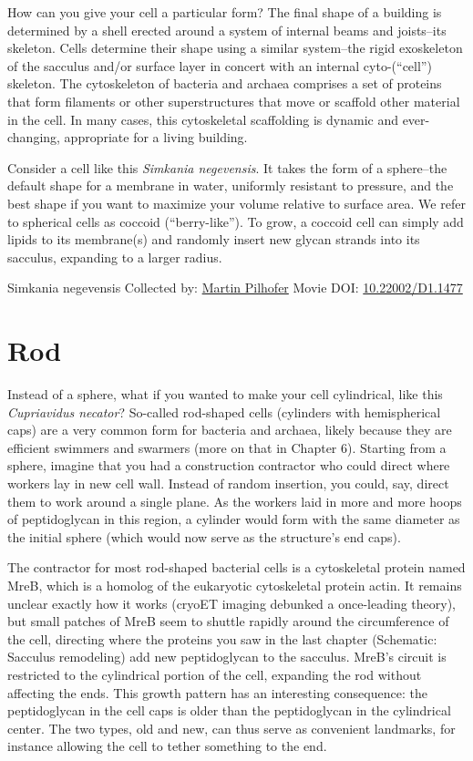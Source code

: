 \documentclass[]{tufte-book}
\begin{document}
How can you give your cell a particular form? The final shape of a building is determined by a shell erected around a system of internal beams and joists--its skeleton. Cells determine their shape using a similar system--the rigid exoskeleton of the sacculus and/or surface layer in concert with an internal cyto-(``cell'') skeleton. The cytoskeleton of bacteria and archaea comprises a set of proteins that form filaments or other superstructures that move or scaffold other material in the cell. In many cases, this cytoskeletal scaffolding is dynamic and ever-changing, appropriate for a living building.

Consider a cell like this \emph{Simkania negevensis}. It takes the form of a sphere--the default shape for a membrane in water, uniformly resistant to pressure, and the best shape if you want to maximize your volume relative to surface area. We refer to spherical cells as coccoid (``berry-like''). To grow, a coccoid cell can simply add lipids to its membrane(s) and randomly insert new glycan strands into its sacculus, expanding to a larger radius.



\hypertarget{htmlwidget-92f7566930dcd09b545d}{}

\label{fig:3-1}Simkania negevensis Collected by: \protect\hyperlink{martin_pilhofer}{Martin Pilhofer} Movie DOI: \href{https://doi.org/10.22002/D1.1477}{10.22002/D1.1477}

\hypertarget{rod}{%
\section{Rod}\label{rod}}

Instead of a sphere, what if you wanted to make your cell cylindrical, like this \emph{Cupriavidus necator}? So-called rod-shaped cells (cylinders with hemispherical caps) are a very common form for bacteria and archaea, likely because they are efficient swimmers and swarmers (more on that in Chapter 6). Starting from a sphere, imagine that you had a construction contractor who could direct where workers lay in new cell wall. Instead of random insertion, you could, say, direct them to work around a single plane. As the workers laid in more and more hoops of peptidoglycan in this region, a cylinder would form with the same diameter as the initial sphere (which would now serve as the structure's end caps).

The contractor for most rod-shaped bacterial cells is a cytoskeletal protein named MreB, which is a homolog of the eukaryotic cytoskeletal protein actin. It remains unclear exactly how it works (cryoET imaging debunked a once-leading theory), but small patches of MreB seem to shuttle rapidly around the circumference of the cell, directing where the proteins you saw in the last chapter (Schematic: Sacculus remodeling) add new peptidoglycan to the sacculus. MreB's circuit is restricted to the cylindrical portion of the cell, expanding the rod without affecting the ends. This growth pattern has an interesting consequence: the peptidoglycan in the cell caps is older than the peptidoglycan in the cylindrical center. The two types, old and new, can thus serve as convenient landmarks, for instance allowing the cell to tether something to the end.
\end{document}

